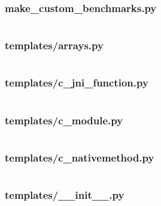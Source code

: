 \documentclass[a4paper,12pt]{article}
\begin{document}
\subsubsection{make\_custom\_benchmarks.py}
\inputminted[fontsize=\small, linenos, numbersep=5pt, tabsize=4, frame=topline,framesep=0.8cm]{python}{/home/tituomin/StudioProjects/nativebenchmark/script/make_custom_benchmarks.py}
\vspace{1cm}
\subsubsection{templates/arrays.py}
\inputminted[fontsize=\small, linenos, numbersep=5pt, tabsize=4, frame=topline,framesep=0.8cm]{python}{/home/tituomin/StudioProjects/nativebenchmark/script/templates/arrays.py}
\vspace{1cm}
\subsubsection{templates/c\_jni\_function.py}
\inputminted[fontsize=\small, linenos, numbersep=5pt, tabsize=4, frame=topline,framesep=0.8cm]{python}{/home/tituomin/StudioProjects/nativebenchmark/script/templates/c_jni_function.py}
\vspace{1cm}
\subsubsection{templates/c\_module.py}
\inputminted[fontsize=\small, linenos, numbersep=5pt, tabsize=4, frame=topline,framesep=0.8cm]{python}{/home/tituomin/StudioProjects/nativebenchmark/script/templates/c_module.py}
\vspace{1cm}
\subsubsection{templates/c\_nativemethod.py}
\inputminted[fontsize=\small, linenos, numbersep=5pt, tabsize=4, frame=topline,framesep=0.8cm]{python}{/home/tituomin/StudioProjects/nativebenchmark/script/templates/c_nativemethod.py}
\vspace{1cm}
\subsubsection{templates/\_\_init\_\_.py}
\inputminted[fontsize=\small, linenos, numbersep=5pt, tabsize=4, frame=topline,framesep=0.8cm]{python}{/home/tituomin/StudioProjects/nativebenchmark/script/templates/__init__.py}
\vspace{1cm}
\end{document}
